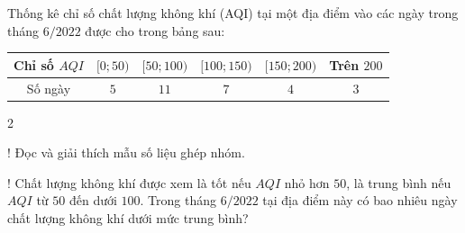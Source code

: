 \begin{ex}%
	Thống kê chỉ số chất lượng không khí (AQI) tại một địa điểm vào các ngày  trong tháng $6/2022$ được cho trong bảng sau:
	\begin{center}
		\begin{tabular}{|c|c|c|c|c|c|}
			 \hline
			Chỉ số  $AQI$ & $[0; 50)$ & $[50; 100)$ & $[100; 150)$ & $[150; 200)$ & Trên $200$ \\
			\hline 
			Số ngày & $5$ &  $11$ & $7$ & $4$ & $3$ \\
			\hline 
		\end{tabular}
	\end{center}
	\begin{enumEX}{2}
		\item! Đọc và giải thích mẫu số  liệu ghép nhóm.
		\item! Chất lượng không khí được xem là tốt nếu $AQI$  nhỏ hơn $50$, là trung bình nếu $AQI$ từ $50$ đến dưới $100$. Trong tháng $6 / 2022$ tại địa điểm này có bao nhiêu ngày chất lượng không khí dưới mức trung bình?
	\end{enumEX}
\end{ex}

